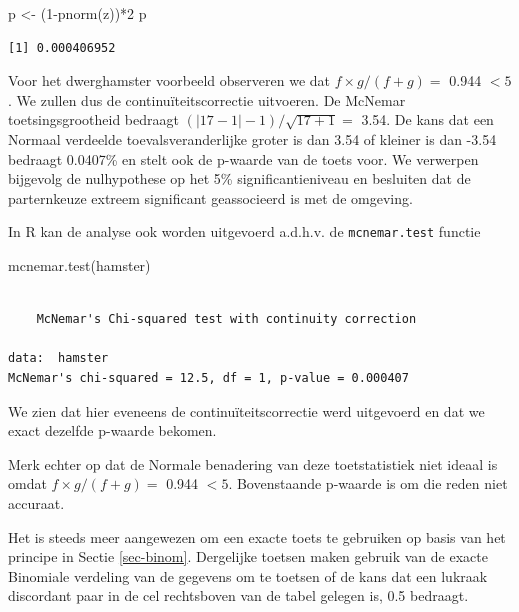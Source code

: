 \documentclass[
  dutch,
  letterpaper,
  12pt]{book}
\newenvironment{Shaded}{\begin{snugshade}}{\end{snugshade}}
\newcommand{\DecValTok}[1]{\textcolor[rgb]{0.68,0.00,0.00}{#1}}
\newcommand{\FunctionTok}[1]{\textcolor[rgb]{0.28,0.35,0.67}{#1}}
\newcommand{\NormalTok}[1]{\textcolor[rgb]{0.00,0.23,0.31}{#1}}
\newcommand{\OtherTok}[1]{\textcolor[rgb]{0.00,0.23,0.31}{#1}}
\newcommand{\SpecialCharTok}[1]{\textcolor[rgb]{0.37,0.37,0.37}{#1}}
\theoremstyle{definition}
\theoremstyle{definition}
\theoremstyle{definition}
\theoremstyle{remark}
\begin{document}
\begin{Shaded}
\begin{Highlighting}[]
\NormalTok{p }\OtherTok{\textless{}{-}}\NormalTok{ (}\DecValTok{1}\SpecialCharTok{{-}}\FunctionTok{pnorm}\NormalTok{(z))}\SpecialCharTok{*}\DecValTok{2}
\NormalTok{p}
\end{Highlighting}
\end{Shaded}

\begin{verbatim}
[1] 0.000406952
\end{verbatim}

Voor het dwerghamster voorbeeld observeren we dat \(f\times g/(f+g)=\)
0.944 \(<5\). We zullen dus de continuïteitscorrectie uitvoeren. De
McNemar toetsingsgrootheid bedraagt
\((\vert 17-1 \vert -1)/\sqrt{17+1}=\) 3.54. De kans dat een Normaal
verdeelde toevalsveranderlijke groter is dan 3.54 of kleiner is dan
-3.54 bedraagt 0.0407\% en stelt ook de p-waarde van de toets voor. We
verwerpen bijgevolg de nulhypothese op het 5\% significantieniveau en
besluiten dat de parternkeuze extreem significant geassocieerd is met de
omgeving.

In R kan de analyse ook worden uitgevoerd a.d.h.v. de
\texttt{mcnemar.test} functie

\begin{Shaded}
\begin{Highlighting}[]
\FunctionTok{mcnemar.test}\NormalTok{(hamster)}
\end{Highlighting}
\end{Shaded}

\begin{verbatim}

    McNemar's Chi-squared test with continuity correction

data:  hamster
McNemar's chi-squared = 12.5, df = 1, p-value = 0.000407
\end{verbatim}

We zien dat hier eveneens de continuïteitscorrectie werd uitgevoerd en
dat we exact dezelfde p-waarde bekomen.

Merk echter op dat de Normale benadering van deze toetstatistiek niet
ideaal is omdat \(f \times g/(f+g)=\) 0.944 \(<5\). Bovenstaande
p-waarde is om die reden niet accuraat.

Het is steeds meer aangewezen om een exacte toets te gebruiken op basis
van het principe in Sectie \ref{sec-binom}. Dergelijke toetsen maken
gebruik van de exacte Binomiale verdeling van de gegevens om te toetsen
of de kans dat een lukraak discordant paar in de cel rechtsboven van de
tabel gelegen is, 0.5 bedraagt.
\end{document}

